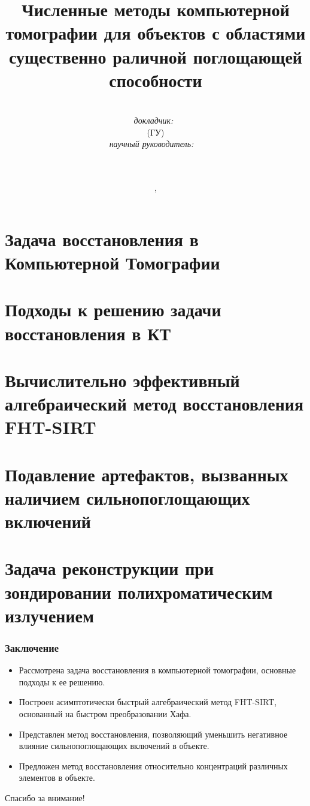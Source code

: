 \documentclass[12pt]{beamer}
\title{\small{
  Численные методы компьютерной томографии для объектов с областями существенно раличной поглощающей способности
}}
\author{\small{%
\ \vspace{10pt} \\
\emph{докладчик:}~\thesisAuthorShort\\ 
\footnotesize{\thesisOrganizationShort (ГУ)}\\%
\vspace{10pt}
\emph{научный руководитель:}~\supervisorRegaliaShort~\supervisorFioShort \\
\footnotesize{\supervisorOrganisationShort}
}\\%
\vspace{15pt}
\thesisSpecialtyNumber \ \footnotesize{\thesisSpecialtyTitle }
\vspace{30pt}%
\vspace{20pt}%
}
\date{\small{\thesisCity, \thesisYear}}
\begin{document}
\maketitle

\section{Задача восстановления в Компьютерной Томографии}


\section{Подходы к решению задачи восстановления в КТ}


\section{Вычислительно эффективный алгебраический метод восстановления FHT-SIRT}


\section{Подавление артефактов, вызванных наличием сильнопоглощающих включений}


\section{Задача реконструкции при зондировании полихроматическим излучением}



\begin{frame}
\frametitle{Заключение}
\begin{itemize}
  \item Рассмотрена задача восстановления в компьютерной томографии, основные подходы к ее решению.
  \item Построен асимптотически быстрый алгебраический метод FHT-SIRT, основанный на быстром преобразовании Хафа.
  \item Представлен метод восстановления, позволяющий уменьшить негативное влияние сильнопоглощающих включений в объекте.
  \item Предложен метод восстановления относительно концентраций различных элементов в объекте.
\end{itemize}
\end{frame}

\begin{frame}
\centering
\large {Спасибо за внимание!}
\end{frame}
\end{document}
